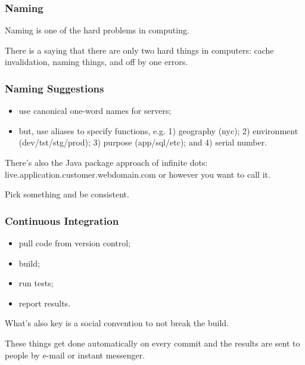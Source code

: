 \begin{frame}
\frametitle{Naming}

Naming is one of the hard problems in computing. 

There is a saying that there are only two hard things in computers: cache invalidation, naming things, and off by one errors. 

\end{frame}



\begin{frame}
\frametitle{Naming Suggestions}

\begin{itemize}
\item use canonical one-word names for servers;
\item but, use aliases to specify functions, e.g. 1) geography (nyc); 2) environment (dev/tst/stg/prod); 
3) purpose (app/sql/etc); and 4) serial number.
\end{itemize}


There's also the Java package approach of infinite dots: live.application.customer.webdomain.com or however you want to call it. 

Pick something and be consistent.

\end{frame}



\begin{frame}
\frametitle{Continuous Integration}

\begin{itemize}
\item pull code from version control;
\item build;
\item run tests;
\item report results.
\end{itemize}

What's also key is a social convention to not break the build. 

These things get done automatically on every commit and the results are sent to people by e-mail or instant messenger.

\end{frame}



